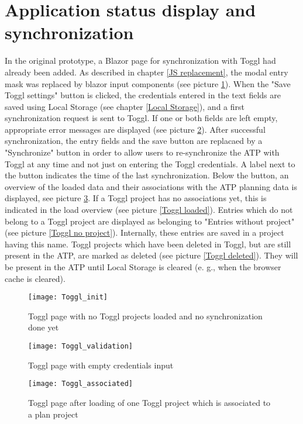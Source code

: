 \section{Application status display and synchronization} \label{Status display}
In the original prototype, a Blazor page for synchronization with Toggl had already been added. As described in chapter \ref{JS replacement}, the modal entry mask was replaced by blazor input components (see picture \ref{Toggl page initial}). When the "Save Toggl settings" button is clicked, the credentials entered in the text fields are saved using Local Storage (see chapter \ref{Local Storage}), and a first synchronization request is sent to Toggl. If one or both fields are left empty, appropriate error messages are displayed (see picture \ref{Toggl page validation}). After successful synchronization, the entry fields and the save button are replacaed by a "Synchronize" button in order to allow users to re-synchronize the ATP with Toggl at any time and not just on entering the Toggl credentials. A label next to the button indicates the time of the last synchronization. Below the button, an overview of the loaded data and their associations with the ATP planning data is displayed, see picture \ref{Toggl associated}. If a Toggl project has no associations yet, this is indicated in the load overview (see picture \ref{Toggl loaded}). Entries which do not belong to a Toggl project are displayed as belonging to "Entries without project" (see picture \ref{Toggl no project}). Internally, these entries are saved in a project having this name. Toggl projects which have been deleted in Toggl, but are still present in the ATP, are marked as deleted (see picture \ref{Toggl deleted}). They will be present in the ATP until Local Storage is cleared (e. g., when the browser cache is cleared).

\begin{figure}[H]
	\centering
	\texttt{[image: Toggl\_init]}
	\caption{Toggl page with no Toggl projects loaded and no synchronization done yet}
	\label{Toggl page initial}
\end{figure}

\begin{figure}[H]
	\centering
	\texttt{[image: Toggl\_validation]}
	\caption{Toggl page with empty credentials input}
	\label{Toggl page validation}
\end{figure}

\begin{figure}[H]
	\centering
	\texttt{[image: Toggl\_associated]}
	\caption{Toggl page after loading of one Toggl project which is associated to a plan project}
	\label{Toggl associated}
\end{figure}

